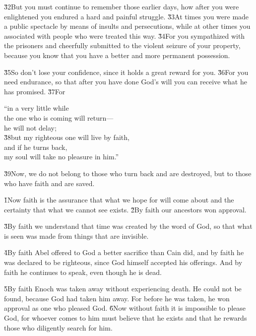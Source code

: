 \v{32}But you must continue to remember those earlier days, how after you were enlightened you endured a hard and painful struggle. \v{33}At times you were made a public spectacle by means of insults and persecutions, while at other times you associated with people who were treated this way. \v{34}For you sympathized with the prisoners and cheerfully submitted to the violent seizure of your property, because you know that you have a better and more permanent possession.

\v{35}So don't lose your confidence, since it holds a great reward for you. \v{36}For you need endurance, so that after you have done God's will you can receive what he has promised. \v{37}For

\begin{poetry}
\poeml ``in a very little while \\
\poemll    the one who is coming will return--- \\
\poemlll       he will not delay; \\
\poeml \v{38}but my righteous one will live by faith, \\
\poemll    and if he turns back, \\
\poemlll       my soul will take no pleasure in him.''
\end{poetry}

\v{39}Now, we do not belong to those who turn back and are destroyed, but to those who have faith and are saved.

\v{1}Now faith is the assurance that what we hope for will come about and the certainty that what we cannot see exists. \v{2}By faith our ancestors won approval.

\v{3}By faith we understand that time was created by the word of God, so that what is seen was made from things that are invisible.

\v{4}By faith Abel offered to God a better sacrifice than Cain did, and by faith he was declared to be righteous, since God himself accepted his offerings. And by faith he continues to speak, even though he is dead.

\v{5}By faith Enoch was taken away without experiencing death. He could not be found, because God had taken him away. For before he was taken, he won approval as one who pleased God. \v{6}Now without faith it is impossible to please God, for whoever comes to him must believe that he exists and that he rewards those who diligently search for him.


